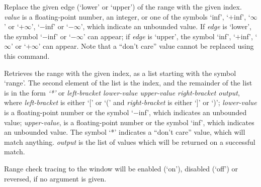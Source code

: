  Replace the given edge (`lower' or `upper') of the range with the given index.
  \emph{value} is a floating-point number, an integer, or one of the symbols `inf', `$+$inf',
  `$\infty$' or `$+\infty$', `$-$inf' or `$-\infty$', which indicate an unbounded value.
  If \emph{edge} is `lower', the symbol `$-$inf' or `$-\infty$' can appear;
  if \emph{edge} is `upper', the symbol `inf', `$+$inf', `$\infty$' or `$+\infty$' can appear.
  Note that a ``don't care'' value cannot be replaced using this command.

  Retrieves the range with the given index, as a list starting with the symbol `range'.
  The second element of the list is the index, and the remainder of the list is in the form
  \emph{`*'} or \emph{left-bracket lower-value upper-value right-bracket output}, where \emph{left-bracket}
  is either `[' or `(' and \emph{right-bracket} is either `]' or `)';
  \emph{lower-value} is a floating-point number or the symbol `$-$inf',
  which indicates an unbounded value; \emph{upper-value}, is a floating-point number or
  the symbol `inf', which indicates an unbounded value.
  The symbol `*' indicates a ``don't care'' value, which will match anything.
  \emph{output} is the list of values which will be returned on a successful match.

  Range check tracing to the \MaxName{} window will be enabled (`on'), disabled (`off') or reversed,
  if no argument is given.
  
  \objListCmdEnd

\objItemFile[]

